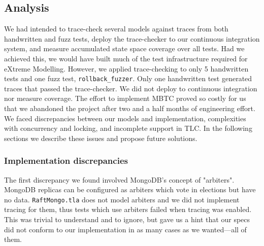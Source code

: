 \documentclass{vldb}
\begin{document}
\subsection{Analysis}
\label{subsec:mbtc_analysis}


We had intended to trace-check several models against traces from both handwritten and fuzz tests, deploy the trace-checker to our continuous integration system, and measure accumulated state space coverage over all tests. Had we achieved this, we would have built much of the test infrastructure required for eXtreme Modelling.
However, we applied trace-checking to only 5 handwritten tests and one fuzz test, \texttt{rollback\_fuzzer}. 
Only one handwritten test generated traces that passed the trace-checker. 
We did not deploy to continuous integration nor measure coverage. 
The effort to implement MBTC proved so costly for us that we abandoned the project after two and a half months of engineering effort. 
We faced discrepancies between our models and implementation, complexities with concurrency and locking, and incomplete support in TLC. 
In the following sections we describe these issues and propose future solutions.

\subsubsection{Implementation discrepancies}
\label{subsubsec:mbtc_impl_discrepencies}

The first discrepancy we found involved MongoDB's concept of "arbiters".
MongoDB replicas can be configured as arbiters which vote in elections but have no data. 
\texttt{RaftMongo.tla} does not model arbiters and we did not implement tracing for them, thus tests which use arbiters failed when tracing was enabled.
This was trivial to understand and to ignore, but gave us a hint that our specs did not conform to our implementation in as many cases as we wanted---all of them.
\end{document}

